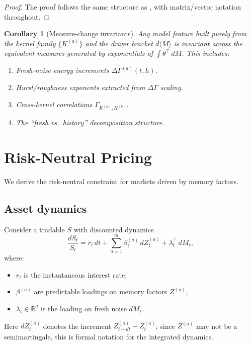 \documentclass[11pt]{article}
\theoremstyle{plain}
\newtheorem{corollary}{Corollary}[section]
\theoremstyle{definition}
\theoremstyle{remark}
\newcommand{\R}{\mathbb{R}}
\newcommand{\dGamma}{\Delta\Gamma}
\newcommand{\bracket}[1]{\langle #1 \rangle}
\begin{document}
\begin{proof}
The proof follows the same structure as , with
matrix/vector notation throughout.
\end{proof}

\begin{corollary}[Measure-change invariants]\label{cor:invariants}
Any model feature built purely from the kernel family $\{K^{(a)}\}$ and
the driver bracket $d\bracket{M}$ is invariant across the equivalent
measures generated by exponentials of $\int \theta^\top\,dM$. This includes:
\begin{enumerate}[label=(\alph*)]
\item Fresh-noise energy increments $\dGamma^{(a)}(t,h)$.
\item Hurst/roughness exponents extracted from $\dGamma$ scaling.
\item Cross-kernel correlations $\Gamma_{K^{(a)}, K^{(b)}}$.
\item The ``fresh vs.\ history'' decomposition structure.
\end{enumerate}
\end{corollary}

\section{Risk-Neutral Pricing}\label{sec:finance}

We derive the risk-neutral constraint for markets driven by memory factors.

\subsection{Asset dynamics}

Consider a tradable $S$ with discounted dynamics
\begin{equation}\label{eq:S-dynamics}
\frac{dS_t}{S_t} = r_t\,dt + \sum_{a=1}^m \beta_t^{(a)}\,dZ_t^{(a)} + \lambda_t^\top\,dM_t,
\end{equation}
where:
\begin{itemize}
\item $r_t$ is the instantaneous interest rate,
\item $\beta^{(a)}$ are predictable loadings on memory factors $Z^{(a)}$,
\item $\lambda_t \in \R^d$ is the loading on fresh noise $dM_t$.
\end{itemize}
Here $dZ_t^{(a)}$ denotes the increment $Z_{t+dt}^{(a)} - Z_t^{(a)}$; since $Z^{(a)}$
may not be a semimartingale, this is formal notation for the integrated dynamics.
\end{document}
